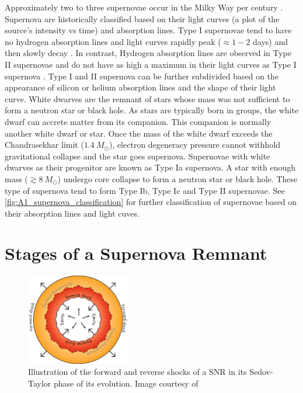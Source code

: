 Approximately two to three supernovae occur in the Milky Way per century \citep{1984AuJPh..37..321M,1994ApJS...92..487T}. Supernova are historically classified based on their light curves (a plot of the source's intensity vs time) and absorption lines. Type I supernovae tend to have no hydrogen absorption lines and light curves rapidly peak ($\approx 1-2$ days) and then slowly decay \citep{alma9928040781501811}. In contrast, Hydrogen absorption lines are observed in Type II supernovae and do not have as high a maximum in their light curves as Type I supernova \citep{alma9928040781501811}. Type I and II supernova can be further subdivided based on the appearance of silicon or helium absorption lines and the shape of their light curve.
\newpar
White dwarves are the remnant of stars whose mass was not sufficient to form a neutron star or black hole. As stars are typically born in groups, the white dwarf can accrete matter from its companion. This companion is normally another white dwarf or star. Once the mass of the white dwarf exceeds the Chandrasekhar limit ($1.4~M_\odot$), electron degeneracy pressure cannot withhold gravitational collapse and the star goes supernova. Supernovae with white dwarves as their progenitor are known as Type Ia supernova. A star with enough mass ($\gtrsim 8~M_\odot$) undergo core collapse to form a neutron star or black hole. These type of supernova tend to form Type Ib, Type Ic and Type II supernovae. See \autoref{fig:A1_supernova_classification} for further classification of supernovae based on their absorption lines and light cuves.

\section{Stages of a Supernova Remnant}

\begin{figure}
	    \centering
	    \includegraphics[width=0.4\textwidth]{A1_Supernova_Remnants/Images/SNR_evolution.png}
	    \caption{Illustration of the forward and reverse shocks of a SNR in its Sedov-Taylor phase of its evolution. Image courtesy of \cite{alma9928040781501811}}
	    \label{fig:A1_SNR_Evolution}
\end{figure}

